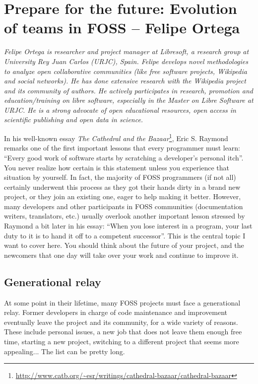 \chapter{Prepare for the future: Evolution of teams in FOSS -- Felipe Ortega}

\textit{Felipe Ortega is researcher and project manager at Libresoft, a research
group at University Rey Juan Carlos (URJC), Spain. Felipe develops novel
methodologies to analyze open collaborative communities (like free software
projects, Wikipedia and social networks). He has done extensive research with
the Wikipedia project and its community of authors. He actively participates in
research, promotion and education/training on libre software, especially in the
Master on Libre Software at URJC. He is a strong advocate of open educational
resources, open access in scientific publishing and open data in science.}

In his well-known essay \textit{The Cathedral and the
Bazaar}\footnote{\url{
http://www.catb.org/~esr/writings/cathedral-bazaar/cathedral-bazaar}}, Eric S.
Raymond remarks one of the first important lessons that every programmer must
learn: ``Every good work of software starts by scratching a developer's personal
itch''. You never realize how certain is this statement unless you experience
that situation by yourself. In fact, the majority of FOSS programmers (if not
all) certainly underwent this process as they got their hands dirty in a brand
new project, or they join an existing one, eager to help making it better.
However, many developers and other participants in FOSS communities
(documentation writers, translators, etc.) usually overlook another important
lesson stressed by Raymond a bit later in his essay: ``When you lose interest in
a program, your last duty to it is to hand it off to a competent successor''.
This is the central topic I want to cover here. You should think about the
future of your project, and the newcomers that one day will take over your work
and continue to improve it.

\section*{Generational relay}

At some point in their lifetime, many FOSS projects must face a generational
relay. Former developers in charge of code maintenance and improvement
eventually leave the project and its community, for a wide variety of reasons.
These include personal issues, a new job that does not leave them enough free
time, starting a new project, switching to a different project that seems more
appealing... The list can be pretty long.

